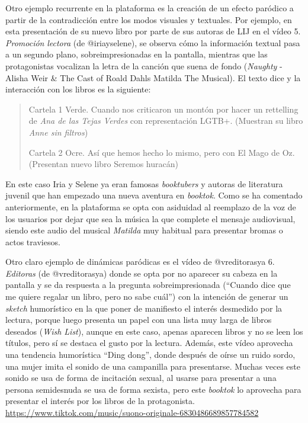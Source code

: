 Otro ejemplo recurrente en la plataforma es la creación de un efecto
paródico a partir de la contradicción \cite{bateman2014} entre los modos
visuales y textuales. Por ejemplo, en esta presentación de su nuevo
libro por parte de sus autoras de LIJ en el vídeo 5. \emph{Promoción}
\emph{lectora} (de @iriayselene), se observa cómo la información textual
pasa a un segundo plano, sobreimpresionadas en la pantalla, mientras que
las protagonistas vocalizan la letra de la canción que suena de fondo
(\emph{Naughty} - Alisha Weir \& The Cast of Roald
Dahl\textquotesingle s Matilda The Musical). El texto dice y la
interacción con los libros es la siguiente:

\begin{quote}
	Cartela 1 Verde. Cuando nos criticaron un montón por hacer un rettelling
	de \emph{Ana de las Tejas Verdes} con representación LGTB+. (Muestran su
	libro \emph{Anne sin filtros})
	
	Cartela 2 Ocre. Así que hemos hecho lo mismo, pero con El Mago de Oz.
	(Presentan nuevo libro Seremos huracán)
\end{quote}


En este caso Iria y Selene ya eran famosas \emph{booktubers} y autoras
de literatura juvenil que han empezado una nueva aventura en
\emph{booktok}. Como se ha comentado anteriormente, en la plataforma se
opta con asiduidad al reemplazo de la voz de los usuarios por dejar que
sea la música la que complete el mensaje audiovisual, siendo este audio
del musical \emph{Matilda} muy habitual para presentar bromas o actos
traviesos.

Otro claro ejemplo de dinámicas paródicas es el vídeo de @vreditorasya
6. \emph{Editoras} (de @vreditorasya) donde se opta por no aparecer su
cabeza en la pantalla y se da respuesta a la pregunta sobreimpresionada
(``Cuando dice que me quiere regalar un libro, pero no sabe cuál'') con
la intención de generar un \emph{sketch} humorístico en la que poner de
manifiesto el interés desmedido por la lectura, porque luego presenta un
papel con una lista muy larga de libros deseados (\emph{Wish List}),
aunque en este caso, apenas aparecen libros y no se leen los títulos,
pero sí se destaca el gusto por la lectura. Además, este vídeo aprovecha
una tendencia humorística ``Ding dong'', donde después de oírse un ruido
sordo, una mujer imita el sonido de una campanilla para presentarse.
Muchas veces este sonido se usa de forma de incitación sexual, al usarse
para presentar a una persona semidesnuda se usa de forma sexista, pero
este \emph{booktok} lo aprovecha para presentar el interés por los
libros de la protagonista.
\url{https://www.tiktok.com/music/suono-originale-6830486689857784582}

